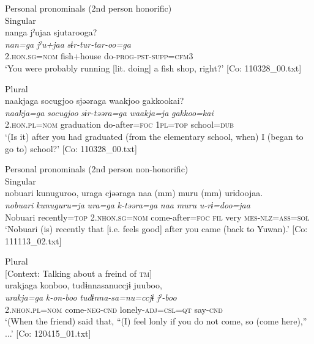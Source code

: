 Personal pronominals (2nd person honorific)\\

\ex Singular\\
{\TM}
\glll  nanga  jˀujaa  sjutarooga?\\
\textit{nan=ga}  \textit{jˀu+jaa}  \textit{sɨr-tur-tar-oo=ga}\\
2.\textsc{hon}.\textsc{sg}=\textsc{nom}  fish+house  do-\textsc{prog}-\textsc{pst}-\textsc{supp}=\textsc{cfm}3\\
\glt ‘You were probably running [lit. doing] a fish shop, right?’ [Co: 110328\_00.txt]

\ex Plural\\
{\TM}
\glll  naakjaga  {\textbar}socugjoo{\textbar}  sjəəraga  waakjoo  {\textbar}gakkoo{\textbar}kai?\\
\textit{naakja=ga}  \textit{socugjoo}  \textit{sɨr-təəra=ga}  \textit{waakja=ja}  \textit{gakkoo=kai}\\
2.\textsc{hon}.\textsc{pl}=\textsc{nom}  graduation  do-after=\textsc{foc}  1\textsc{pl}=\textsc{top}  school=\textsc{dub}\\
\glt ‘(Is it) after you had graduated (from the elementary school, when) I (began to go to) school?’ [Co: 110328\_00.txt]


Personal pronominals (2nd person non-honorific)\\

\ex Singular\\
{\TM}
\glll  nobuari  kunuguroo,  uraga  cjəəraga    naa  (mm)  muru  (mm)  urɨdoojaa.\\
\textit{nobuari}  \textit{kunuguru=ja}  \textit{ura=ga}  \textit{k-təəra=ga}    \textit{naa}    \textit{muru}    \textit{u-rɨ=doo=jaa}\\
Nobuari  recently=\textsc{top}  2.\textsc{nhon}.\textsc{sg}=\textsc{nom}  come-after=\textsc{foc}  \textsc{fil}    very    \textsc{mes}-\textsc{nlz}=\textsc{ass}=\textsc{sol}\\
\glt ‘Nobuari (is) recently that [i.e. feels good] after you came (back to Yuwan).’ [Co: 111113\_02.txt]

\ex  Plural\\{}
    [Context: Talking about a freind of \textsc{tm}]\\

{\TM}
\glll urakjaga  konboo,  tudɨnnasanuccjɨ  juuboo,\\
      \textit{urakja=ga}  \textit{k-on-boo}  \textit{tudɨnna-sa=nu=ccjɨ}  \textit{jˀ-boo}\\
      2.\textsc{nhon}.\textsc{pl}=\textsc{nom}  come-\textsc{neg}-\textsc{cnd}  lonely-\textsc{adj}=\textsc{csl}=\textsc{qt}  say-\textsc{cnd}\\
\glt ‘(When the friend) said that, “(I) feel lonly if you do not come, so (come here),” ...’ [Co: 120415\_01.txt]



